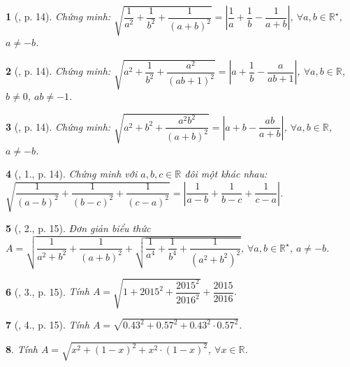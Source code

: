 \documentclass{article}
\newtheorem{baitoan}{}%
\begin{document}
\begin{baitoan}[\cite{Binh_boi_duong_Toan_9_tap_1}, p. 14]
	Chứng minh: $\sqrt{\dfrac{1}{a^2} + \dfrac{1}{b^2} + \dfrac{1}{(a + b)^2}} = \left|\dfrac{1}{a} + \dfrac{1}{b} - \dfrac{1}{a + b}\right|$, $\forall a,b\in\mathbb{R}^\star$, $a\ne-b$.
\end{baitoan}

\begin{baitoan}[\cite{Binh_boi_duong_Toan_9_tap_1}, p. 14]
	Chứng minh: $\sqrt{a^2 + \dfrac{1}{b^2} + \dfrac{a^2}{(ab + 1)^2}} = \left|a + \dfrac{1}{b} - \dfrac{a}{ab + 1}\right|$, $\forall a,b\in\mathbb{R}$, $b\ne0$, $ab\ne-1$.
\end{baitoan}

\begin{baitoan}[\cite{Binh_boi_duong_Toan_9_tap_1}, p. 14]
	Chứng minh: $\sqrt{a^2 + b^2 + \dfrac{a^2b^2}{(a + b)^2}} = \left|a + b - \dfrac{ab}{a + b}\right|$, $\forall a,b\in\mathbb{R}$, $a\ne-b$.
\end{baitoan}

\begin{baitoan}[\cite{Binh_boi_duong_Toan_9_tap_1}, 1., p. 14]
	Chứng minh với $a,b,c\in\mathbb{R}$ đôi một khác nhau: $\sqrt{\dfrac{1}{(a - b)^2} + \dfrac{1}{(b - c)^2} + \dfrac{1}{(c - a)^2}} = \left|\dfrac{1}{a - b} + \dfrac{1}{b - c} + \dfrac{1}{c - a}\right|$.
\end{baitoan}

\begin{baitoan}[\cite{Binh_boi_duong_Toan_9_tap_1}, 2., p. 15]
	Đơn giản biểu thức $A = \sqrt{\dfrac{1}{a^2 + b^2} + \dfrac{1}{(a + b)^2} + \sqrt{\dfrac{1}{a^4} + \dfrac{1}{b^4} + \dfrac{1}{(a^2 + b^2)^2}}}$, $\forall a,b\in\mathbb{R}^\star$, $a\ne-b$.
\end{baitoan}

\begin{baitoan}[\cite{Binh_boi_duong_Toan_9_tap_1}, 3., p. 15]
	Tính $A = \sqrt{1 + 2015^2 + \dfrac{2015^2}{2016^2}} + \dfrac{2015}{2016}$.
\end{baitoan}

\begin{baitoan}[\cite{Binh_boi_duong_Toan_9_tap_1}, 4., p. 15]
	Tính $A = \sqrt{0.43^2 + 0.57^2 + 0.43^2\cdot0.57^2}$.
\end{baitoan}

\begin{baitoan}
	Tính $A = \sqrt{x^2 + (1 - x)^2 + x^2\cdot(1 - x)^2}$, $\forall x\in\mathbb{R}$.
\end{baitoan}
\end{document}
